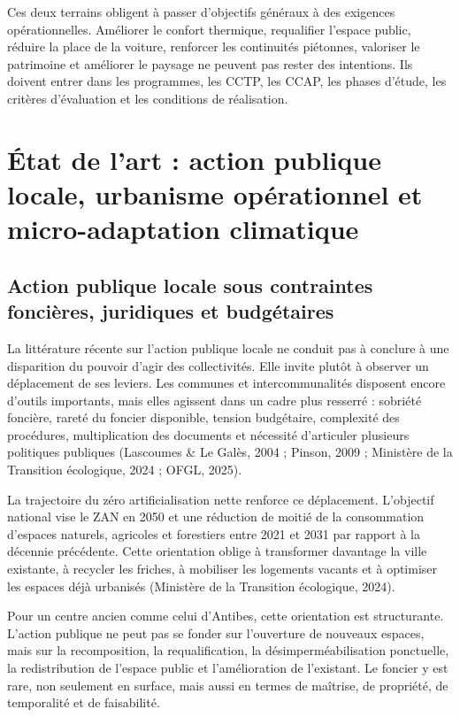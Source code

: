 \documentclass[11pt,a4paper]{report}
\begin{document}
Ces deux terrains obligent à passer d'objectifs généraux à des exigences opérationnelles. Améliorer le confort thermique, requalifier l'espace public, réduire la place de la voiture, renforcer les continuités piétonnes, valoriser le patrimoine et améliorer le paysage ne peuvent pas rester des intentions. Ils doivent entrer dans les programmes, les CCTP, les CCAP, les phases d'étude, les critères d'évaluation et les conditions de réalisation.

\section{État de l'art : action publique locale, urbanisme opérationnel et micro-adaptation climatique}

\subsection{Action publique locale sous contraintes foncières, juridiques et budgétaires}

La littérature récente sur l'action publique locale ne conduit pas à conclure à une disparition du pouvoir d'agir des collectivités. Elle invite plutôt à observer un déplacement de ses leviers. Les communes et intercommunalités disposent encore d'outils importants, mais elles agissent dans un cadre plus resserré : sobriété foncière, rareté du foncier disponible, tension budgétaire, complexité des procédures, multiplication des documents et nécessité d'articuler plusieurs politiques publiques (Lascoumes \& Le Galès, 2004 ; Pinson, 2009 ; Ministère de la Transition écologique, 2024 ; OFGL, 2025).

La trajectoire du zéro artificialisation nette renforce ce déplacement. L'objectif national vise le ZAN en 2050 et une réduction de moitié de la consommation d'espaces naturels, agricoles et forestiers entre 2021 et 2031 par rapport à la décennie précédente. Cette orientation oblige à transformer davantage la ville existante, à recycler les friches, à mobiliser les logements vacants et à optimiser les espaces déjà urbanisés (Ministère de la Transition écologique, 2024).

Pour un centre ancien comme celui d'Antibes, cette orientation est structurante. L'action publique ne peut pas se fonder sur l'ouverture de nouveaux espaces, mais sur la recomposition, la requalification, la désimperméabilisation ponctuelle, la redistribution de l'espace public et l'amélioration de l'existant. Le foncier y est rare, non seulement en surface, mais aussi en termes de maîtrise, de propriété, de temporalité et de faisabilité.
\end{document}
